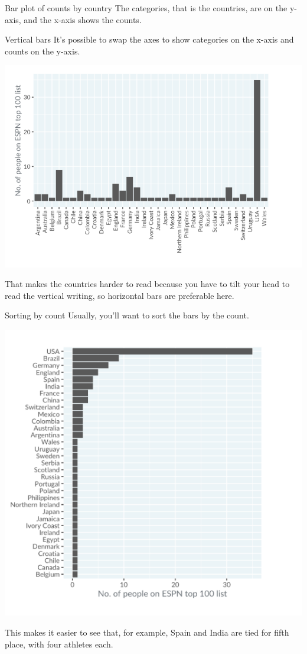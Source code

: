\documentclass[
  ignorenonframetext,
]{beamer}
\begin{document}
\begin{frame}{Bar plot of counts by country}
\label{bar-plot-of-counts-by-country-1}
The categories, that is the countries, are on the y-axis, and the x-axis
shows the counts.
\end{frame}

\begin{frame}{Vertical bars}
\label{vertical-bars}
It's possible to swap the axes to show categories on the x-axis and
counts on the y-axis.

\includegraphics{../images/im51.png}

That makes the countries harder to read because you have to tilt your
head to read the vertical writing, so horizontal bars are preferable
here.
\end{frame}

\begin{frame}{Sorting by count}
\label{sorting-by-count}
Usually, you'll want to sort the bars by the count.

\includegraphics{../images/im52.png}

This makes it easier to see that, for example, Spain and India are tied
for fifth place, with four athletes each.
\end{frame}
\end{document}
